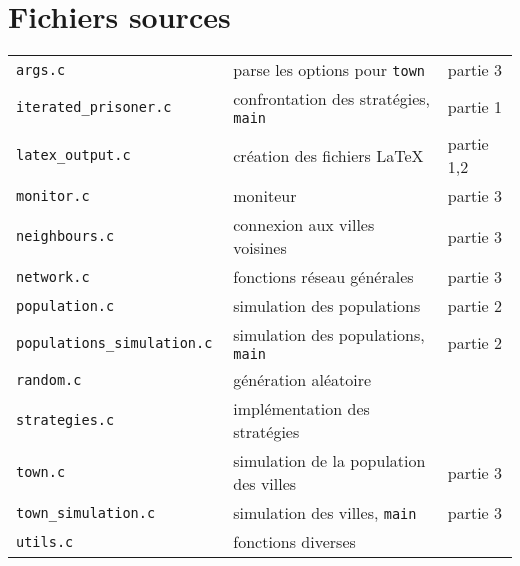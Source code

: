 \documentclass[10pt]{article}
\begin{document}
\section{Fichiers sources}

\begin{tabular}[h]{lll}
\tt{args.c}                       & parse les options pour \verb|town|         & partie 3    \\
\tt{iterated\_{}prisoner.c}       & confrontation des stratégies, \verb|main|  & partie 1    \\
\tt{latex\_{}output.c}            & création des fichiers \LaTeX               & partie 1,2  \\
\tt{monitor.c}                    & moniteur                                   & partie 3    \\
\tt{neighbours.c}                 & connexion aux villes voisines              & partie 3    \\
\tt{network.c}                    & fonctions réseau générales                 & partie 3    \\
\tt{population.c}                 & simulation des populations                 & partie 2    \\
\tt{populations\_{}simulation.c}  & simulation des populations, \verb|main|    & partie 2    \\
\tt{random.c}                     & génération aléatoire                       &             \\
\tt{strategies.c}                 & implémentation des stratégies              &             \\
\tt{town.c}                       & simulation de la population des villes     & partie 3    \\
\tt{town\_{}simulation.c}         & simulation des villes, \verb|main|         & partie 3    \\
\tt{utils.c}                      & fonctions diverses                         &             \\
\end{tabular}
\end{document}
